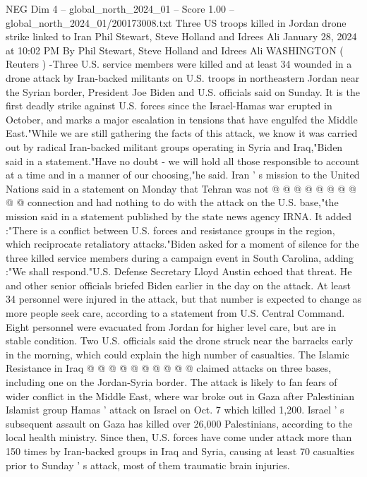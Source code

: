 \begin{textsample}{NEG Dim 4 – global\_north\_2024\_01 – Score 1.00 – global\_north\_2024\_01/200173008.txt}  \label{ex:f4_neg_112}
Three US troops killed in Jordan drone strike linked to Iran Phil Stewart, Steve Holland and Idrees Ali January 28, 2024 at 10:02 PM By Phil Stewart, Steve Holland and Idrees Ali WASHINGTON ( Reuters ) -Three U.S. service members were killed and at least 34 wounded in a drone attack by Iran-backed militants on U.S. troops in northeastern Jordan near the Syrian border, President Joe Biden and U.S. officials said on Sunday.
It is the first deadly strike against U.S. forces since the Israel-Hamas war erupted in October, and marks a major escalation in tensions that have engulfed the Middle East."While we are still gathering the facts of this attack, we know it was carried out by radical Iran-backed militant groups operating in Syria and Iraq,"Biden said in a statement."Have no doubt - we will hold all those responsible to account at a time and in a manner of our choosing,"he said.
Iran ' s mission to the United Nations said in a statement on Monday that Tehran was not @ @ @ @ @ @ @ @ @ @ connection and had nothing to do with the attack on the U.S. base,"the mission said in a statement published by the state news agency IRNA.
It added :"There is a conflict between U.S. forces and resistance groups in the region, which reciprocate retaliatory attacks."Biden asked for a moment of silence for the three killed service members during a campaign event in South Carolina, adding :"We shall respond."U.S.
Defense Secretary Lloyd Austin echoed that threat.
He and other senior officials briefed Biden earlier in the day on the attack.
At least 34 personnel were injured in the attack, but that number is expected to change as more people seek care, according to a statement from U.S.
Central Command.
Eight personnel were evacuated from Jordan for higher level care, but are in stable condition.
Two U.S. officials said the drone struck near the barracks early in the morning, which could explain the high number of casualties.
The Islamic Resistance in Iraq @ @ @ @ @ @ @ @ @ @ claimed attacks on three bases, including one on the Jordan-Syria border.
The attack is likely to fan fears of wider conflict in the Middle East, where war broke out in Gaza after Palestinian Islamist group Hamas ' attack on Israel on Oct. 7 which killed 1,200.
Israel ' s subsequent assault on Gaza has killed over 26,000 Palestinians, according to the local health ministry.
Since then, U.S. forces have come under attack more than 150 times by Iran-backed groups in Iraq and Syria, causing at least 70 casualties prior to Sunday ' s attack, most of them traumatic brain injuries.

\end{textsample}
